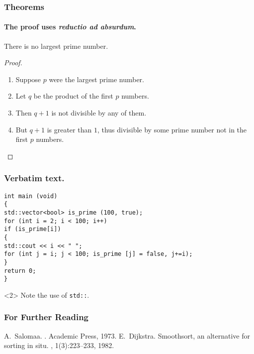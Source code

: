 \documentclass[hyperref=unicode]{beamer}
\begin{document}
\begin{frame}
\frametitle{Theorems}

\framesubtitle{The proof uses \textit{reductio ad absurdum}.}
\begin{theorem}
There is no largest prime number.
\end{theorem}
\begin{proof}
\begin{enumerate}[<+-| alert@+>]
\item Suppose $p$ were the largest prime number.
\item Let $q$ be the product of the first $p$ numbers.
\item Then $q+1$ is not divisible by any of them.
\item But $q + 1$ is greater than $1$, thus divisible by some prime
number not in the first $p$ numbers.\qedhere
\end{enumerate}
\end{proof}

\end{frame}



\begin{frame}[fragile]

\frametitle{Verbatim text.}


\begin{verbatim}
int main (void)
{
std::vector<bool> is_prime (100, true);
for (int i = 2; i < 100; i++)
if (is_prime[i])
{
std::cout << i << " ";
for (int j = i; j < 100; is_prime [j] = false, j+=i);
}
return 0;
}
\end{verbatim}
\begin{uncoverenv}<2>
Note the use of \verb|std::|.
\end{uncoverenv}

\end{frame}

\begin{frame}
\frametitle{For Further Reading}
\begin{thebibliography}{Dijkstra, 1982}
A.~Salomaa.
.
\newblock Academic Press, 1973.
E.~Dijkstra.
\newblock Smoothsort, an alternative for sorting in situ.
, 1(3):223--233, 1982.
\end{thebibliography}
\end{frame}
\end{document}
